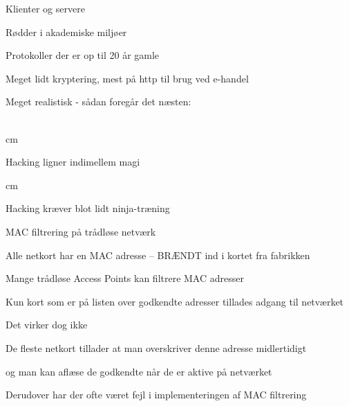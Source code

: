 \documentclass[Screen16to9,17pt]{foils}
\begin{document}





\begin{list1}
\item Klienter og servere
\item Rødder i akademiske miljøer
\item Protokoller der er op til 20 år gamle
\item Meget lidt kryptering, mest på http til brug ved e-handel
\end{list1}


Meget realistisk - sådan foregår det næsten:\\
\\





 cm

\centerline{Hacking ligner indimellem  magi}




 cm
\centerline{Hacking kræver blot lidt ninja-træning}


\begin{list1}
\item MAC filtrering på trådløse netværk
\item Alle netkort har en MAC adresse -- BRÆNDT ind i kortet fra fabrikken
\item Mange trådløse Access Points kan filtrere MAC adresser
\item Kun kort som er på listen over godkendte adresser tillades adgang til netværket

\item Det virker dog ikke \smiley
\item De fleste netkort tillader at man overskriver denne adresse midlertidigt
\item og man kan aflæse de godkendte når de er aktive på netværket
\item Derudover har der ofte været fejl i implementeringen af MAC filtrering
\end{list1}
\end{document}
